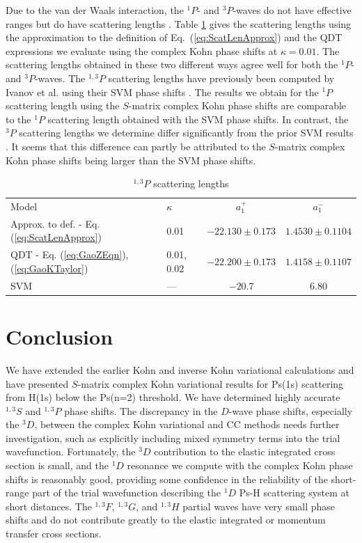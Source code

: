 \documentclass[preprint,showpacs,showkeys,preprintnumbers,amsmath,amssymb,longbibliography,pra,aps]{revtex4-1}
\begin{document}
Due to the van der Waals interaction,
the $^{1}P$- and $^3P$-waves do not have effective ranges but do have scattering lengths 
\cite{Levy1963}. Table \ref{tab:PWaveScatLen} gives the scattering lengths 
using the approximation to the definition of
Eq.~(\ref{eq:ScatLenApprox}) and the QDT expressions we evaluate using the complex Kohn 
phase shifts at $\kappa = 0.01$.
The scattering lengths obtained in these two different ways
agree well for both the $^1P$- and $^3P$-waves.
The $^{1,3}P$ scattering lengths have previously been computed by Ivanov et al.
using their SVM phase shifts \cite{Ivanov2002}. The results we obtain for the $^1P$
scattering length using the $S$-matrix complex Kohn phase shifts
are comparable to the
$^1P$ scattering length obtained with the SVM phase shifts.
In contrast, the $^3P$ scattering lengths we determine differ significantly
from the prior SVM results \cite{Ivanov2002}. It seems that this difference
can partly be attributed to the $S$-matrix complex Kohn phase shifts being
larger than the SVM phase shifts.


\begin{table}[H]
\begin{center}
\begin{ruledtabular}
\begin{tabular}{l l c c}
Model & $\kappa$ & $a_1^+$ & $a_1^-$ \\
\colrule
Approx. to def. - Eq. (\ref{eq:ScatLenApprox}) & 0.01 & $-22.130 \pm 0.173$ & $1.4530 \pm 0.1104$ \\
QDT - Eq. (\ref{eq:GaoZEqn}), (\ref{eq:GaoKTaylor}) & 0.01, 0.02 & $-22.200 \pm 0.173$ & $1.4158 \pm 0.1107$ \\
\colrule
SVM \cite{Ivanov2002} & --- & $-20.7$ & $6.80$ 
\end{tabular}
\end{ruledtabular}
\caption{$^{1,3}P$ scattering lengths}
\label{tab:PWaveScatLen}
\end{center}
\end{table}


\section{Conclusion}
We have extended the earlier Kohn 
and inverse Kohn variational calculations \cite{VanReeth2003,VanReeth2004}
and have presented $S$-matrix complex Kohn variational results for Ps(1s)
scattering from H(1s) below the Ps(n=2) threshold.
We have determined highly accurate $^{1,3}S$ and $^{1,3}P$ phase shifts.
The discrepancy in the $D$-wave phase shifts, especially the $^3D$, between the 
complex Kohn variational and CC methods needs further investigation, such as 
explicitly including mixed symmetry terms into the trial wavefunction.
Fortunately, the $^3D$ contribution to the elastic integrated 
cross section is small, and the $^1D$ resonance we compute with the complex Kohn 
phase shifts is reasonably good, providing some confidence in the reliability 
of the short-range part of the trial wavefunction describing the $^1D$ Ps-H 
scattering system at short distances. The $^{1,3}F$, $^{1,3}G$, and $^{1,3}H$ partial
waves have very small phase shifts and do not contribute greatly to the
elastic integrated or momentum transfer cross sections.
\end{document}
